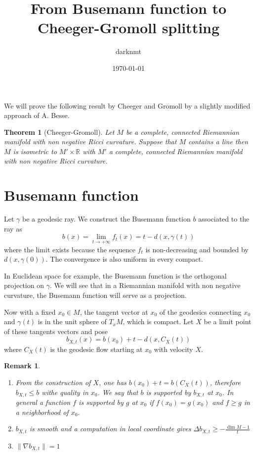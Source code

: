 \documentclass[11pt]{article}
\author{darknmt}
\date{\today}
\title{From Busemann function to Cheeger-Gromoll splitting}
\newtheorem{remark}{Remark}
\newtheorem{theorem}{Theorem}
\begin{document}
\maketitle
\tableofcontents

We will prove the following result by Cheeger and Gromoll by a slightly modified approach of
A. Besse.


\begin{theorem}[Cheeger-Gromoll]
\label{orgb894694}
\label{thm:cheeger-gromoll}
Let \(M\) be a complete, connected Riemannian manifold with non negative Ricci curvature. Suppose
that \(M\) contains a line then \(M\) is isometric to \(M'\times \mathbb{R}\) with \(M'\) a complete,
connected Riemannian manifold with non negative Ricci curvature.
\end{theorem}

\section{Busemann function}
\label{sec:org989b52f}

Let \(\gamma\) be a geodesic ray. We construct the Busemann function \(b\) associated to the ray as
\[
b(x) = \lim_{t\to+\infty}f_t(x) = t - d(x,\gamma(t))
\]
where the limit exists because the sequence \(f_t\) is non-decreasing and bounded by
\(d(x,\gamma(0))\). The convergence is also uniform in every compact. 


In Euclidean space for example, the Busemann function is the orthogonal projection on \(\gamma\). We
will see that in a Riemannian manifold with non negative curvature, the Busemann function will serve
as a projection.


Now with a fixed \(x_0\in M\), the tangent vector at \(x_0\) of the geodesics connecting \(x_0\) and
\(\gamma(t)\) is in the unit sphere of \(T_xM\), which is compact. Let \(X\) be a limit point of these
tangents vectors and pose
\[
b_{X,t}(x) = b(x_0) + t - d(x, C_X(t))
\]
where \(C_X(t)\) is the geodesic flow starting at \(x_0\) with velocity \(X\).

\begin{remark}
\begin{enumerate}
\item From the construction of \(X\), one has \(b(x_0) + t = b(C_X(t))\), therefore \(b_{X,t} \leq b\) withe
quality in \(x_0\). We say that \(b\) is supported by \(b_{X,t}\) at \(x_0\). In general a function \(f\)
is \emph{supported} by \(g\) at \(x_0\) if \(f(x_0)=g(x_0)\) and \(f\geq g\) in a neighborhood of \(x_0\).
\item \(b_{X,t}\) is smooth and a computation in local coordinate gives \(\Delta b_{X,t} \geq -\frac{\dim
   M - 1}{t}\)
\item \(\|\nabla b_{X,t}\| = 1\)
\end{enumerate}
\end{remark}
\end{document}
